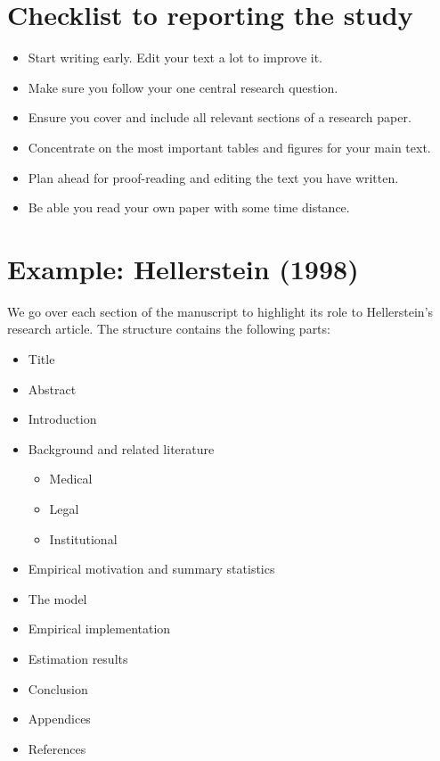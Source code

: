 \documentclass[
]{book}
\providecommand{\tightlist}{%
  \setlength{\itemsep}{0pt}\setlength{\parskip}{0pt}}
\begin{document}
\hypertarget{checklist-to-reporting-the-study}{%
\section{Checklist to reporting the
study}\label{checklist-to-reporting-the-study}}

\begin{itemize}
\tightlist
\item
  Start writing early. Edit your text a lot to improve it.
\item
  Make sure you follow your one central research question.
\item
  Ensure you cover and include all relevant sections of a research
  paper.
\item
  Concentrate on the most important tables and figures for your main
  text.
\item
  Plan ahead for proof-reading and editing the text you have written.
\item
  Be able you read your own paper with some time distance.
\end{itemize}

\hypertarget{example-hellerstein-1998-4}{%
\section{Example: Hellerstein (1998)}\label{example-hellerstein-1998-4}}

We go over each section of the manuscript to highlight its role to
Hellerstein's research article. The structure contains the following
parts:

\begin{itemize}
\item
  Title
\item
  Abstract
\item
  Introduction
\item
  Background and related literature

  \begin{itemize}
  \tightlist
  \item
    Medical
  \item
    Legal
  \item
    Institutional
  \end{itemize}
\item
  Empirical motivation and summary statistics
\item
  The model
\item
  Empirical implementation
\item
  Estimation results
\item
  Conclusion
\item
  Appendices
\item
  References
\end{itemize}
\end{document}
